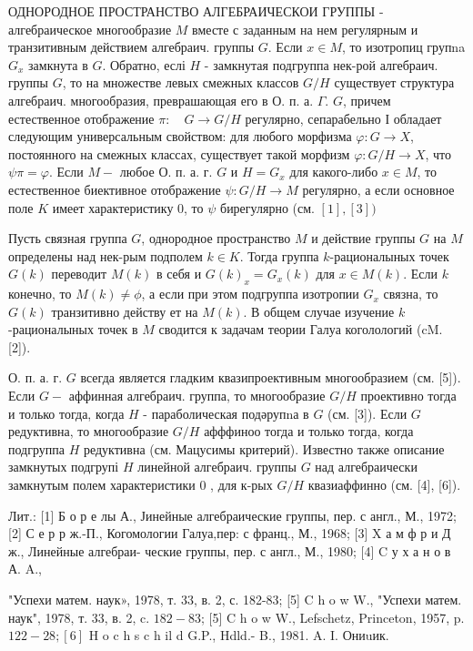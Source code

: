 \documentclass[10pt]{article}
\begin{document}
ОДНОРОДНОЕ ПРОСТРАНСТВО АЛГЕБРАИЧЕСКОИ ГРУППЫ - алгебраическое многообразие $M$ вместе с заданным на нем регулярным и транзитивным действием алгебраич. группы $G$. Если $x \in M$, то изотропиц групna $G_{x}$ замкнута в $G$. Обратно, еслі $H$ - замкнутая подгруппа нек-рой алгебраич. группы $G$, то на множестве левых смежных классов $G / H$ существует структура алгебраич. многообразия, преврашающая его в О. п. а. $\Gamma$. $G$, причем естественное отображение $\pi: \quad G \rightarrow G / H$ регулярно, сепарабельно І обладает следующим универсальным свойством: для любого морфизма $\varphi: G \rightarrow X$, постоянного на смежных классах, существует такой морфизм $\varphi: G / H \rightarrow X$, что $\psi \pi=\varphi$. Если $M-$ любое О. п. а. г. $G$ и $H=G_{x}$ для какого-либо $x \in M$, то естественное биективное отображение $\psi: G / H \rightarrow M$ регулярно, а если основное поле $K$ имеет характеристику 0, то $\psi$ бирегулярно (см. $[1],[3])$



Пусть связная группа $G$, однородное пространство $M$ и действие группы $G$ на $M$ определены над нек-рым подполем $k \in K$. Тогда группа $k$-рационалыных точек $G(k)$ переводит $M(k)$ в себя и $G(k)_{x}=G_{x}(k)$ для $x \in M(k)$. Если $k$ конечно, то $M(k) \neq \phi$, а если при этом подгруппа изотропии $G_{x}$ связна, то $G(k)$ транзитивно действу ет на $M(k)$. В общем случае изучение $k$-рационалыных точек в $M$ сводится к задачам теории Галуа коголологий (cM. [2]).



О. п. а. г. $G$ всегда является гладким квазипроективным многообразием (см. [5]). Если $G-$ аффинная алгебраич. группа, то многообразие $G / H$ проективно тогда и только тогда, когда $H$ - параболическая подәрупnа в $G$ (см. [3]). Если $G$ редуктивна, то многообразие $G / H$ афффиноо тогда и только тогда, когда подгруппа $H$ редуктивна (см. Мацусимы критерий). Известно также описание замкнутых подгрупі $H$ линейной алгебраич. группы $G$ над алгебраически замкнутым полем характеристики 0 , для к-рых $G / H$ квазиаффинно (см. [4], [6]).



Лит.: [1] Б о р е лы А., Јинейные алгебраические группы, пер. с англ., М., 1972; [2] С е р р ж.-П., Когомологии Галуа,пер: с франц., М., 1968; [3] X а м ф р и Д ж., Линейные алгебраи- ческие группы, пер. с англ., М., 1980; [4] C у х а н о в А. A.,

"Успехи матем. наук», 1978, т. 33, в. 2, с. 182-83; [5] C h o w W., "Успехи матем. наук", 1978, т. 33, в. 2, c. $182-83$; [5] C h o w W., Lefschetz, Princeton, 1957, p. $122-28 ;[6]$ H o c h s c h il d G.P., Hdld.- B., 1981. A. I. Ониuик.
\end{document}
